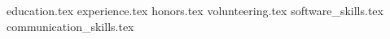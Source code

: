\documentclass[11pt, a4paper]{awesome-cv}
\newcommand*{\sectiondir}{resume/}
\begin{document}
\makecvheader

{education.tex}
{experience.tex}
{honors.tex}
{volunteering.tex}
{software_skills.tex}
{communication_skills.tex}
\end{document}
